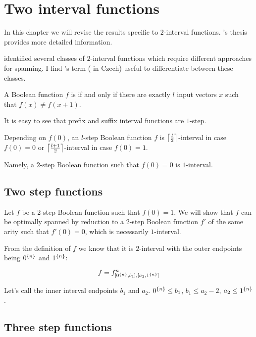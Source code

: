 \chapter{Two interval functions}

In this chapter we will revise the results specific to
$2$-interval functions.
\dubovsky{}'s
thesis\cite{Dubovsky2012}
provides more detailed information.

\dubovsky{} identified several classes
of $2$-interval functions
which require different approaches for spanning.
I find \husek{}'s term \cite[p.~13]{Husek2014}
( in Czech)
useful to differentiate between these classes.

\begin{definition}
A Boolean function $f$ is 
if and only if
there are exactly $l$ input vectors $x$ such that
$f(x) \neq f(x+1)$.
\end{definition}

It is easy to see that
prefix and suffix interval functions are $1$-step.

Depending on $f(0)$,
an $l$-step Boolean function $f$
is $\ceil*{\frac{l}{2}}$-interval in case $f(0) = 0$
or $\ceil*{\frac{l+1}{2}}$-interval in case $f(0) = 1$.

Namely,
a $2$-step Boolean function such that $f(0) = 0$
is $1$-interval.

\section{Two step functions}

Let $f$ be a $2$-step Boolean function
such that $f(0) = 1$.
We will show that $f$
can be optimally spanned by reduction to
a $2$-step Boolean function $f'$ of the same arity
such that $f'(0) = 0$,
which is necessarily $1$-interval.

From the definition of $f$ we know that it is $2$-interval
with the outer endpoints being
$\rep{0}{n}$ and $\rep{1}{n}$:

\[
f = f^n_{\interval{\rep{0}{n}}{b_1},
\interval{a_2}{\rep{1}{n}}}
\]

Let's call the inner interval endpoints $b_1$ and $a_2$.
$\rep{0}{n} \leq b_1$,
$b_1 \leq a_2 - 2$,
$a_2 \leq \rep{1}{n}$.

\section{Three step functions}

